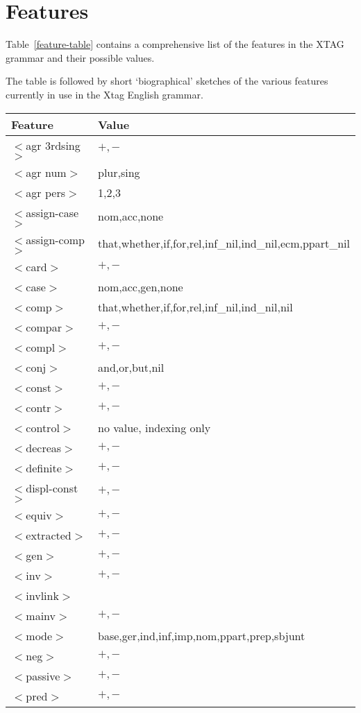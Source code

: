 \chapter{Features}
\label{features}

Table~\ref{feature-table} contains a comprehensive list of the features in the
XTAG grammar and their possible values.

The table is followed by short `biographical' sketches of the various features
currently in use in the Xtag English grammar.

\footnotesize
\begin{table}[hbt]
\centering
\begin{tabular}{|l|l|}
\hline
Feature&Value\\
\hline
\hline
$<$agr 3rdsing$>$&$+,-$\\
$<$agr num$>$&plur,sing\\
$<$agr pers$>$&1,2,3\\
$<$assign-case$>$&nom,acc,none\\
$<$assign-comp$>$&that,whether,if,for,rel,inf\_nil,ind\_nil,ecm,ppart\_nil\\
$<$card$>$&$+,-$\\
$<$case$>$&nom,acc,gen,none\\
$<$comp$>$&that,whether,if,for,rel,inf\_nil,ind\_nil,nil\\
$<$compar$>$&$+,-$\\
$<$compl$>$&$+,-$\\
$<$conj$>$&and,or,but,nil\\
$<$const$>$&$+,-$\\
$<$contr$>$&$+,-$\\
$<$control$>$&no value, indexing only\\
$<$decreas$>$&$+,-$\\
$<$definite$>$&$+,-$\\
$<$displ-const$>$&$+,-$\\
$<$equiv$>$&$+,-$\\
$<$extracted$>$&$+,-$\\
$<$gen$>$&$+,-$\\
$<$inv$>$&$+,-$\\
$<$invlink$>$&\\
$<$mainv$>$&$+,-$\\
$<$mode$>$&base,ger,ind,inf,imp,nom,ppart,prep,sbjunt\\
$<$neg$>$&$+,-$\\
$<$passive$>$&$+,-$\\
$<$pred$>$&$+,-$\\

\end{tabular}
\end{table}
